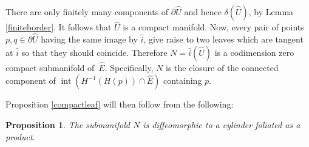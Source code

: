 \documentclass[10pt]{amsart}
\DeclareMathOperator{\inte}{int}
\newtheorem{proposition}[theorem]{Proposition}
\theoremstyle{definition}
\theoremstyle{remark}
\numberwithin{equation}{section}
\begin{document}
There are only finitely many components of $\partial\wideparen{U}$ and hence
$\delta(\wideparen{U})$, by Lemma \ref{finiteborder}. It follows that $\wideparen{U}$ is a compact manifold.
Now, every pair of points $p,q\in \partial \wideparen{U}$ having the same image by $\wideparen{i}$, give raise
to two leaves which are tangent at $\wideparen{i}$ so that they should coincide.
Therefore $N=\wideparen{i}(\wideparen{U})$ is a
codimension zero compact submanifold of~$\widehat{E}$.
Specifically, $N$ is the closure of the connected component of $\inte (H^{-1}(H(p))\cap \widehat{E})$ containing $p$.

Proposition \ref{compactleaf} will then follow from the following:

\begin{proposition}\label{cylinder}
The submanifold $N$ is diffeomorphic to a cylinder foliated as a product.
\end{proposition}
\end{document}
